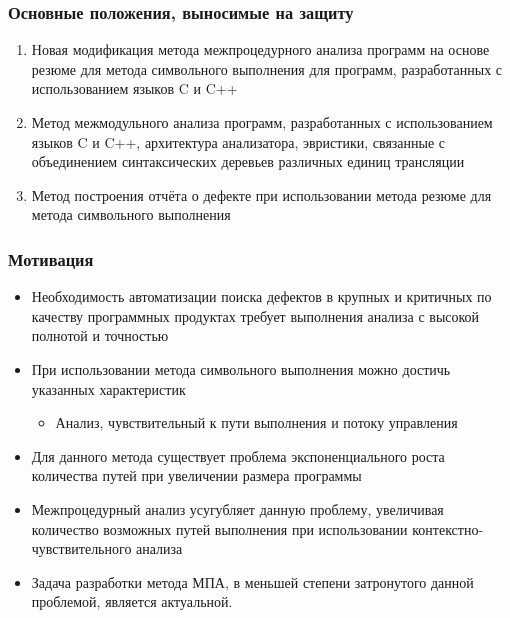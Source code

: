 \documentclass[14pt]{beamer}
\begin{document}
\begin{frame}[allowframebreaks]
\frametitle{Основные положения, выносимые на защиту}
\begin{enumerate}
  \item Новая модификация метода межпроцедурного анализа программ на основе резюме для метода символьного выполнения для программ, разработанных с использованием языков C и C++
  \item Метод межмодульного анализа программ, разработанных с использованием языков C и C++, архитектура анализатора, эвристики, связанные с объединением синтаксических деревьев различных единиц трансляции
  \item Метод построения отчёта о дефекте при использовании метода резюме для метода символьного выполнения
\end{enumerate}
\end{frame}

\begin{frame}[allowframebreaks]
\frametitle{Мотивация}
\begin{itemize}
  \item Необходимость автоматизации поиска дефектов в крупных и критичных по качеству программных продуктах требует выполнения анализа с высокой полнотой и точностью
  \item При использовании метода символьного выполнения можно достичь указанных характеристик
  \begin{itemize}
    \item Анализ, чувствительный к пути выполнения и потоку управления
  \end{itemize}

  \item Для данного метода существует проблема экспоненциального роста количества путей при увеличении размера программы
  \item Межпроцедурный анализ усугубляет данную проблему, увеличивая количество возможных путей выполнения при использовании контекстно-чувствительного анализа
  \item Задача разработки метода МПА, в меньшей степени затронутого данной проблемой, является актуальной.
\end{itemize}
\end{frame}
\end{document}

